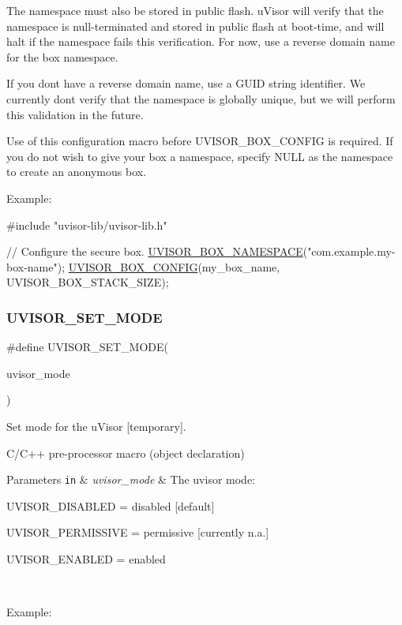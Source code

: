 The namespace must also be stored in public flash. u\+Visor will verify that the namespace is null-\/terminated and stored in public flash at boot-\/time, and will halt if the namespace fails this verification. For now, use a reverse domain name for the box namespace.

If you don\textquotesingle{}t have a reverse domain name, use a G\+U\+ID string identifier. We currently don\textquotesingle{}t verify that the namespace is globally unique, but we will perform this validation in the future.

Use of this configuration macro before U\+V\+I\+S\+O\+R\+\_\+\+B\+O\+X\+\_\+\+C\+O\+N\+F\+IG is required. If you do not wish to give your box a namespace, specify N\+U\+LL as the namespace to create an anonymous box.

Example\+:
\begin{DoxyCode}
\textcolor{preprocessor}{#include "uvisor-lib/uvisor-lib.h"}

\textcolor{comment}{// Configure the secure box.}
\hyperlink{group__hypervisor_gafe52bfcc466d459d149c63966c2f4a58}{UVISOR\_BOX\_NAMESPACE}(\textcolor{stringliteral}{"com.example.my-box-name"});
\hyperlink{group__hypervisor_ga6143739a0475a71e8002f540de3c53f0}{UVISOR\_BOX\_CONFIG}(my\_box\_name, UVISOR\_BOX\_STACK\_SIZE);
\end{DoxyCode}
 \hypertarget{group__hypervisor_ga7cb080278fc7d660addf9bbff6d3f2da}{}\label{group__hypervisor_ga7cb080278fc7d660addf9bbff6d3f2da}
\subsubsection{\texorpdfstring{U\+V\+I\+S\+O\+R\+\_\+\+S\+E\+T\+\_\+\+M\+O\+DE}{UVISOR\_SET\_MODE}}
{\footnotesize\ttfamily \#define U\+V\+I\+S\+O\+R\+\_\+\+S\+E\+T\+\_\+\+M\+O\+DE(\begin{DoxyParamCaption}\item[{}]{uvisor\+\_\+mode }\end{DoxyParamCaption})}



Set mode for the u\+Visor \mbox{[}temporary\mbox{]}.

C/\+C++ pre-\/processor macro (object declaration)


\begin{DoxyParams}[1]{Parameters}
\mbox{\tt in}  & {\em uvisor\+\_\+mode} & The uvisor mode\+:
\begin{DoxyItemize}
\item U\+V\+I\+S\+O\+R\+\_\+\+D\+I\+S\+A\+B\+L\+ED = disabled \mbox{[}default\mbox{]}
\item U\+V\+I\+S\+O\+R\+\_\+\+P\+E\+R\+M\+I\+S\+S\+I\+VE = permissive \mbox{[}currently n.\+a.\mbox{]}
\item U\+V\+I\+S\+O\+R\+\_\+\+E\+N\+A\+B\+L\+ED = enabled
\end{DoxyItemize}\\
\hline
\end{DoxyParams}
Example\+:


